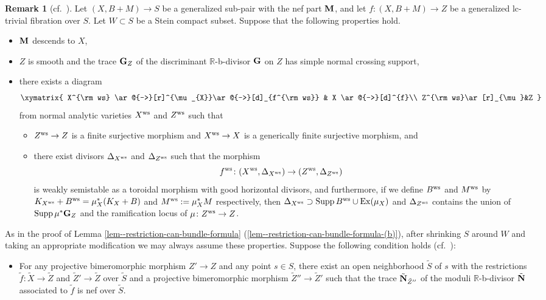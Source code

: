 \documentclass[12pt]{amsart}
\theoremstyle{definition}
\newtheorem{rem}[thm]{Remark}
\begin{document}
\begin{rem}[{cf.~\cite[Theorem 4.13]{filipazzi-gen-can-bundle-formula}}]\label{rem--descend-variety}
Let $(X,B+M) \to S$ be a generalized sub-pair with the nef part $\boldsymbol{\rm M}$, and let $f\colon (X,B+M) \to Z$ be a generalized lc-trivial fibration over $S$. 
Let $W \subset S$ be a Stein compact subset. 
Suppose that the following properties hold.
\begin{itemize}
\item
$\boldsymbol{\rm M}$ descends to $X$,  
\item
$Z$ is smooth and the trace $\boldsymbol{\rm G}_{Z}$ of the discriminant $\mathbb{R}$-b-divisor $\boldsymbol{\rm G}$ on $Z$ has simple normal crossing support,
\item
there exists a diagram
 $$
\xymatrix{
X^{\rm ws} \ar@{->}[r]^{\mu_{X}}\ar@{->}[d]_{f^{\rm ws}} & X \ar@{->}[d]^{f}\\
Z^{\rm ws}\ar[r]_{\mu}&Z
}
$$
from normal analytic varieties $X^{\rm ws}$ and $Z^{\rm ws}$ such that 
\begin{itemize}
\item
$Z^{\rm ws} \to Z$ is a finite surjective morphism and $X^{\rm ws} \to X$ is a generically finite surjective morphism, and
\item
there exist divisors $\Delta_{X^{\rm ws}}$ and $\Delta_{Z^{\rm ws}}$ such that the morphism
$$f^{\rm ws}\colon (X^{\rm ws},\Delta_{X^{\rm ws}}) \to (Z^{\rm ws},\Delta_{Z^{\rm ws}})$$
is weakly semistable as a toroidal morphism with good horizontal divisors, and furthermore, if we define $B^{\rm ws}$ and $M^{\rm ws}$ by $K_{X^{\rm ws}}+B^{\rm ws}=\mu^{*}_{X}(K_{X}+B)$ and $M^{\rm ws}:=\mu^{*}_{X}M$ respectively, then $\Delta_{X^{\rm ws}} \supset {\rm Supp}\,B^{\rm ws} \cup {\rm Ex}(\mu_{X})$ and $\Delta_{Z^{\rm ws}}$ contains the union of ${\rm Supp}\,\mu^{*}\boldsymbol{\rm G}_{Z}$ and the ramification locus of $\mu \colon Z^{\rm ws} \to Z$.  
\end{itemize}
\end{itemize}
As in the proof of Lemma \ref{lem--restriction-can-bundle-formula} (\ref{lem--restriction-can-bundle-formula-(b)}), after shrinking $S$ around $W$ and taking an appropriate modification we may always assume these properties. 
Suppose the following condition holds (cf.~\cite[Theorem 21.4 (4)]{fujino-analytic-bchm}):
\begin{itemize}
\item[($*$)]
For any projective bimeromorphic morphism $Z' \to Z$ and any point $s \in S$, there exist an open neighborhood $\tilde{S}$ of $s$ with the restrictions $\tilde{f} \colon \tilde{X} \to \tilde{Z}$ and $\tilde{Z}' \to \tilde{Z}$ over $\tilde{S}$ and a projective bimeromorphic morphism $\tilde{Z}'' \to \tilde{Z}'$ such that the trace $\tilde{\boldsymbol{\rm N}}_{\tilde{Z}''}$ of the moduli $\mathbb{R}$-b-divisor $\tilde{\boldsymbol{\rm N}}$ associated to $\tilde{f}$ is nef over $\tilde{S}$. 

\end{itemize}
\end{rem}
\end{document}

